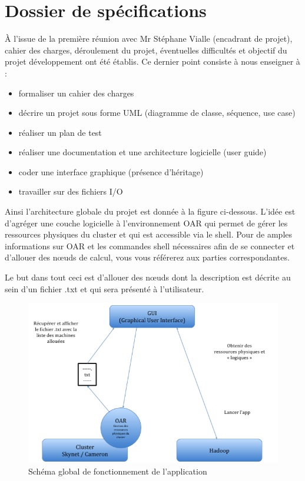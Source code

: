 \section{Dossier de spécifications}

\par À l’issue de la première réunion avec Mr Stéphane Vialle (encadrant de projet), cahier des charges, déroulement du projet, éventuelles difficultés et objectif du projet développement ont été établis. Ce dernier point consiste à nous enseigner à :
\begin{itemize}
\item formaliser un cahier des charges
\item décrire un projet sous forme UML (diagramme de classe, séquence, use case)
\item réaliser un plan de test
\item réaliser une documentation et une architecture logicielle (user guide)
\item coder une interface graphique (présence d’héritage)
\item travailler sur des fichiers I/O
\end{itemize}

\par Ainsi l’architecture globale du projet est donnée à la figure ci-dessous. L’idée est d’agréger une couche logicielle à l’environnement OAR qui permet de gérer les ressources physiques du cluster et qui est accessible via le shell.  Pour de amples informations sur OAR et les commandes shell nécessaires afin de se connecter et d’allouer des nœuds de calcul, vous vous référerez aux parties correspondantes.

\par Le but dans tout ceci est d’allouer des nœuds dont la description est décrite au sein d’un fichier .txt et qui sera présenté à l’utilisateur.
\begin{figure}[h!]
  \centering
  \includegraphics[width=14cm]{images/schema_global.png}
  \caption{Schéma global de fonctionnement de l'application}
  \label{fig:schema_global}
\end{figure}

